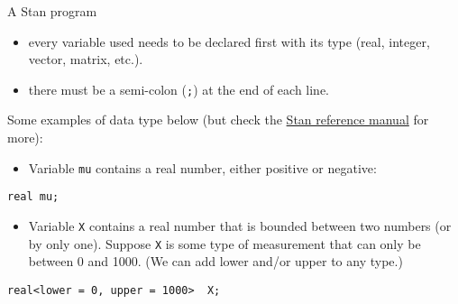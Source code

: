 \documentclass[12pt,ignorenonframetext,aspectratio=169]{beamer}
\providecommand{\tightlist}{%
  \setlength{\itemsep}{0pt}\setlength{\parskip}{0pt}}
\begin{document}
\begin{frame}[fragile]{A Stan program}
\protect\hypertarget{a-stan-program-2}{}

\begin{itemize}
\tightlist
\item
  every variable used needs to be declared first with its type (real, integer, vector, matrix, etc.).
\item
  there must be a semi-colon (\texttt{;}) at the end of each line.
\end{itemize}

\end{frame}

\begin{frame}[fragile]

\begin{block}{Some examples of data type below (but check the \href{https://mc-stan.org/docs/2_22/reference-manual/data-types-chapter.html}{Stan reference manual} for more):}

\begin{itemize}
\tightlist
\item
  Variable \texttt{mu} contains a real number, either positive or negative:
\end{itemize}

\texttt{real\ mu;}

\begin{itemize}
\tightlist
\item
  Variable \texttt{X} contains a real number that is bounded between two numbers (or by only one). Suppose \texttt{X} is some type of measurement that can only be between 0 and 1000. (We can add lower and/or upper to any type.)
\end{itemize}

\texttt{real\textless{}lower\ =\ 0,\ upper\ =\ 1000\textgreater{}\ \ X;}

\end{block}

\end{frame}
\end{document}
